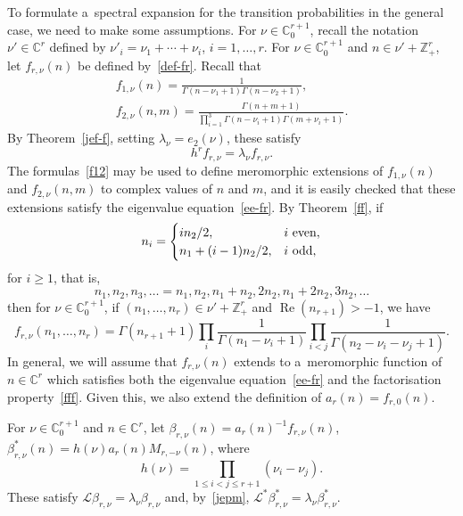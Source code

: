 \documentclass[pdftex]{sigma}
\theoremstyle{definition}
\newcommand{\C}{{\mathbb C}}
\newcommand\Z{{\mathbb Z}}
\newcommand\cL{{\mathcal L}}
\begin{document}
To formulate a~spectral expansion for the transition probabilities in the general case,
we need to make some assumptions. For $\nu\in\C^{r+1}_0$, recall the notation $\nu'\in\C^r$
defined by $\nu'_i=\nu_1+\cdots+\nu_i$, $i=1,\dots,r$. For $\nu\in\C^{r+1}_0$ and $n\in\nu'+\Z_+^r$,
let $ f_{r,\nu}(n)$ be defined by~\eqref{def-fr}.
Recall that
\begin{gather}
 f_{1,\nu}(n) =\frac1{\Gamma(n-\nu_1+1)\Gamma(n-\nu_2+1)},\nonumber\\
f_{2,\nu}(n,m)=\frac{\Gamma(n+m+1)}{\prod_{i=1}^3 \Gamma(n-\nu_i+1)\Gamma(m+\nu_i+1)}.\label{f12}
\end{gather}
By Theorem~\ref{jef-f}, setting $\lambda_\nu=e_2(\nu)$, these satisfy
\begin{equation}\label{ee-fr} h^r f_{r,\nu} = \lambda_\nu f_{r,\nu}.\end{equation}
The formulas~\eqref{f12}
may be used to define meromorphic extensions of $f_{1,\nu}(n)$ and $f_{2,\nu}(n,m)$
to complex values of $n$ and $m$, and it is easily checked that these extensions satisfy the eigenvalue equation~\eqref{ee-fr}. By Theorem~\ref{ff}, if
\[ n_i=\begin{cases}
 in_2/2, & i \mbox{ \rm even},\\ n_1+(i-1)n_2/2, & i \mbox{ \rm odd},\end{cases}\]
for $i\ge 1$, that is,
\begin{equation}\label{spec}
 n_1,n_2,n_3,\ldots =n_1,n_2,n_1+n_2,2n_2,n_1+2n_2,3n_2,\ldots \end{equation}
then for $\nu\in\C_0^{r+1}$, if $(n_1,\dots,n_r)\in \nu'+\Z_+^{r}$ and $\operatorname{Re}(n_{r+1})>-1$, we have
\begin{equation}\label{fff} f_{r,\nu}(n_1,\dots,n_r) = \Gamma(n_{r+1}+1) \prod_i \frac1{\Gamma(n_1-\nu_i+1) }\prod_{i<j} \frac1{\Gamma(n_2-\nu_i-\nu_j+1)}.\end{equation}
In general, we will assume that $f_{r,\nu}(n)$ extends to a~meromorphic function of $n\in\C^r$
which satisfies both the eigenvalue equation~\eqref{ee-fr} and the factorisation property~\eqref{fff}.
Given this, we also extend the definition of $a_r(n)=f_{r,0}(n)$.

For $\nu\in\C^{r+1}_0$ and $n\in\C^r$, let
$\beta_{r,\nu}(n) = a_r(n)^{-1} f_{r,\nu}(n)$, $ \beta^*_{r,\nu}(n) = h(\nu) a_r(n) M_{r,-\nu}(n)$,
where \[h(\nu)=\prod_{1\le i<j\le r+1}(\nu_i-\nu_j).\]
These satisfy $\cL\beta_{r,\nu}=\lambda_\nu\beta_{r,\nu}$ and, by~\eqref{jepm},
$\cL^*\beta^*_{r,\nu}=\lambda_\nu\beta^*_{r,\nu}$.
\end{document}
